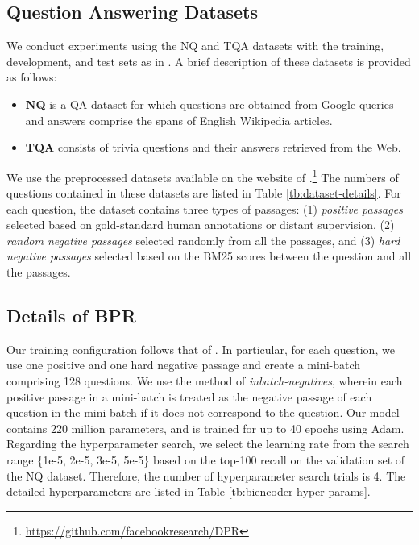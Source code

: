 \documentclass[11pt,a4paper]{article}
\begin{document}
\subsection{Question Answering Datasets}
\label{sec:dataset-datails}
We conduct experiments using the NQ and TQA datasets with the training, development, and test sets as in \citet{Lee2019LatentAnswering,Karpukhin2020DenseAnswering}.
A brief description of these datasets is provided as follows:

\begin{itemize}[leftmargin=10pt,topsep=1pt,itemsep=0pt]
\item \textbf{NQ} is a QA dataset for which questions are obtained from Google queries and answers comprise the spans of English Wikipedia articles.
\item \textbf{TQA} consists of trivia questions and their answers retrieved from the Web.
\end{itemize}

We use the preprocessed datasets available on the website of \citet{Karpukhin2020DenseAnswering}.\footnote{\url{https://github.com/facebookresearch/DPR}}
The numbers of questions contained in these datasets are listed in Table \ref{tb:dataset-details}.
For each question, the dataset contains three types of passages: (1) \textit{positive passages} selected based on gold-standard human annotations or distant supervision, (2) \textit{random negative passages} selected randomly from all the passages, and (3) \textit{hard negative passages} selected based on the BM25 scores between the question and all the passages.

\subsection{Details of BPR}
\label{details-training}
Our training configuration follows that of \citet{Karpukhin2020DenseAnswering}.
In particular, for each question, we use one positive and one hard negative passage and create a mini-batch comprising 128 questions.
We use the method of \textit{inbatch-negatives}, wherein each positive passage in a mini-batch is treated as the negative passage of each question in the mini-batch if it does not correspond to the question.
Our model contains 220 million parameters, and is trained for up to 40 epochs using Adam.
Regarding the hyperparameter search, we select the learning rate from the search range \{1e-5, 2e-5, 3e-5, 5e-5\} based on the top-100 recall on the validation set of the NQ dataset.
Therefore, the number of hyperparameter search trials is 4.
The detailed hyperparameters are listed in Table \ref{tb:biencoder-hyper-params}.
\end{document}
